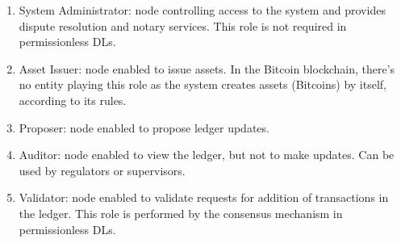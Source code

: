 \begin{enumerate}
    \item System Administrator: node controlling access to the system and provides dispute resolution and notary services. This role is not required in permissionless DLs.
    \item Asset Issuer: node enabled to issue assets. In the Bitcoin blockchain, there's no entity playing this role as the system creates assets (Bitcoins) by itself, according to its rules.
    \item Proposer: node enabled to propose ledger updates.
    \item Auditor: node enabled to view the ledger, but not to make updates. Can be used by regulators or supervisors.
    \item Validator: node enabled to validate requests for addition of transactions in the ledger. This role is performed by the consensus mechanism in permissionless DLs.
\end{enumerate}


